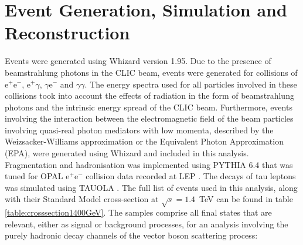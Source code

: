\section{Event Generation, Simulation and Reconstruction}
\label{sec:eventgenerationandbackgrounds}
Events were generated using Whizard \cite{0708.4233, hep-ph/0102195} version 1.95.  Due to the presence of beamstrahlung photons in the CLIC beam, events were generated for collisions of $\text{e}^{+}\text{e}^{-}$, $\text{e}^{+}\gamma$, $\gamma\text{e}^{-}$ and $\gamma\gamma$.  The energy spectra used for all particles involved in these collisions took into account the effects of radiation in the form of beamstrahlung photons and the intrinsic energy spread of the CLIC beam.  Furthermore, events involving the interaction between the electromagnetic field of the beam particles involving quasi-real photon mediators with low momenta, described by the Weizsacker-Williams approximation \cite{vonWeizsacker:1934nji, Williams:1935dka} or the Equivalent Photon Approximation (EPA), were generated using Whizard and included in this analysis.  Fragmentation and hadronisation was implemented using PYTHIA 6.4 \cite{Sjostrand:2006za} that was tuned for OPAL $\text{e}^{+}\text{e}^{-}$ collision data recorded at LEP \cite{Alexander:1995bk}.  The decays of tau leptons was simulated using TAUOLA \cite{Was:2000st}.  The full list of events used in this analysis, along with their Standard Model cross-section at $\sqrt{s}=1.4$~TeV can be found in table \ref{table:crosssection1400GeV}.  The samples comprise all final states that are relevant, either as signal or background processes, for an analysis involving the purely hadronic decay channels of the vector boson scattering process:
